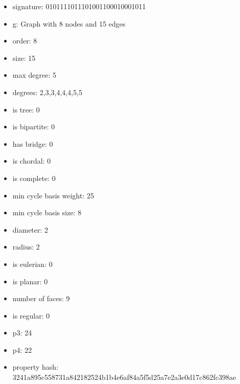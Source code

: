 \begin{itemize}
\item signature: 0101111011101001100010001011
\item g: Graph with 8 nodes and 15 edges
\item order: 8
\item size: 15
\item max degree: 5
\item degrees: 2,3,3,4,4,4,5,5
\item is tree: 0
\item is bipartite: 0
\item has bridge: 0
\item is chordal: 0
\item is complete: 0
\item min cycle basis weight: 25
\item min cycle basis size: 8
\item diameter: 2
\item radius: 2
\item is eulerian: 0
\item is planar: 0
\item number of faces: 9
\item is regular: 0
\item p3: 24
\item p4: 22
\item property hash: 3241a895c558731a842182524b1b4e6af84a5f5d25a7e2a3e0d17c862fc398ae
\end{itemize}
\newpage
\begin{figure}
\end{figure}
